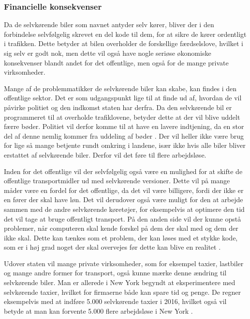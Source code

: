 \subsubsection{Financielle konsekvenser}
Da de selvkørende biler som navnet antyder selv kører, bliver der i den forbindelse selvfølgelig skrevet en del kode til dem, for at sikre de kører ordentligt i trafikken. Dette betyder at bilen overholder de forskellige færdselslove, hvilket i sig selv er godt nok, men dette vil også have nogle seriøse økonomiske konsekvenser blandt andet for det offentlige, men også for de mange private virksomheder. 

Mange af de problemmatikker de selvkørende biler kan skabe, kan findes i den offentlige sektor. Det er som udgangspunkt lige til at finde ud af, hvordan de vil påvirke politiet og den indkomst staten har derfra. Da den selvkørende bil er programmeret til at overholde trafiklovene, betyder dette at der vil blive uddelt færre bøder. Politiet vil derfor komme til at have en lavere indtjening, da en stor del af denne nemlig kommer fra uddeling af bøder \cite{B}. Der vil heller ikke være brug for lige så mange betjente rundt omkring i landene, især ikke hvis alle biler bliver erstattet af selvkørende biler. Derfor vil det føre til flere arbejdsløse. 

Inden for det offentlige vil der selvfølgelig også være en mulighed for at skifte de offentlige transportmidler ud med selvkørende versioner. Dette vil på mange måder være en fordel for det offentlige, da det vil være billigere, fordi der ikke er en fører der skal have løn. Det vil derudover også være muligt for den at arbejde sammen med de andre selvkørende køretøjer, for eksempelvis at optimere den tid det vil tage at bruge offentligt transport. På den anden side vil der kunne opstå problemer, når computeren skal kende forskel på dem der skal med og dem der ikke skal. Dette kan tænkes som et problem, der kan løses med et stykke kode, som er i høj grad noget der skal overvejes før dette kan blive en realitet \cite{BUS}.

Udover staten vil mange private virksomheder, som for eksempel taxier, lastbiler og mange andre former for transport, også kunne mærke denne ændring til selvkørende biler. Man er allerede i New York begyndt at eksperimentere med selvkørende taxier, hvilket for firmaerne både kan spare tid og penge. De regner eksempelvis med at indføre 5.000 selvkørende taxier i 2016, hvilket også vil betyde at man kan forvente 5.000 flere arbejdsløse i New York \cite{TAXI}. 

